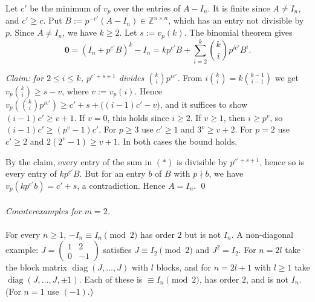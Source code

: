 \begin{solution}
    Let \( c' \) be the minimum of \( v_p \) over the entries of \( A - I_n \). It is finite since \( A \neq I_n \), and \( c' \geq c \). Put \( B := p^{-c'}\left(A - I_n\right) \in \mathbb{Z}^{n \times n} \), which has an entry not divisible by \( p \). Since \( A \neq I_n \), we have \( k \geq 2 \). Let \( s := v_p\left(k\right) \). The binomial theorem gives
    \begin{equation*}
        \mathbf{0} = \left(I_n + p^{c'}B\right)^k - I_n = k p^{c'} B + \sum_{i=2}^{k} \binom{k}{i} p^{ic'} B^i. \tag{\( * \)}
    \end{equation*}

    \emph{Claim: for \( 2 \leq i \leq k \), \( p^{c'+s+1} \) divides \( \binom{k}{i} p^{ic'} \).} From \( i\binom{k}{i} = k\binom{k-1}{i-1} \) we get \( v_p\binom{k}{i} \geq s - v \), where \( v := v_p\left(i\right) \). Hence \( v_p\!\left(\binom{k}{i}p^{ic'}\right) \geq c' + s + \big(\left(i-1\right)c' - v\big) \), and it suffices to show \( \left(i-1\right)c' \geq v + 1 \). If \( v = 0 \), this holds since \( i \geq 2 \). If \( v \geq 1 \), then \( i \geq p^v \), so \( \left(i-1\right)c' \geq \left(p^v - 1\right)c' \). For \( p \geq 3 \) use \( c' \geq 1 \) and \( 3^v \geq v + 2 \). For \( p = 2 \) use \( c' \geq 2 \) and \( 2\left(2^v - 1\right) \geq v + 1 \). In both cases the bound holds.

    By the claim, every entry of the sum in \( \left(*\right) \) is divisible by \( p^{c'+s+1} \), hence so is every entry of \( k p^{c'} B \). But for an entry \( b \) of \( B \) with \( p \nmid b \), we have \( v_p\left(k p^{c'} b\right) = c' + s \), a contradiction. Hence \( A = I_n \). \qed
    \\\\
    \textit{Counterexamples for \( m = 2 \).}
    \\\\
    For every \( n \geq 1 \), \( -I_n \equiv I_n \pmod 2 \) has order \( 2 \) but is not \( I_n \). A non-diagonal example: \( J = \begin{pmatrix} 1 & 2 \\ 0 & -1 \end{pmatrix} \) satisfies \( J \equiv I_2 \pmod 2 \) and \( J^2 = I_2 \). For \( n = 2l \) take the block matrix \( \operatorname{diag}\left(J, \dots, J\right) \) with \( l \) blocks, and for \( n = 2l + 1 \) with \( l \geq 1 \) take \( \operatorname{diag}\left(J, \dots, J, \pm 1\right) \). Each of these is \( \equiv I_n \pmod 2 \), has order \( 2 \), and is not \( I_n \). (For \( n = 1 \) use \( \left(-1\right) \).)
\end{solution}
